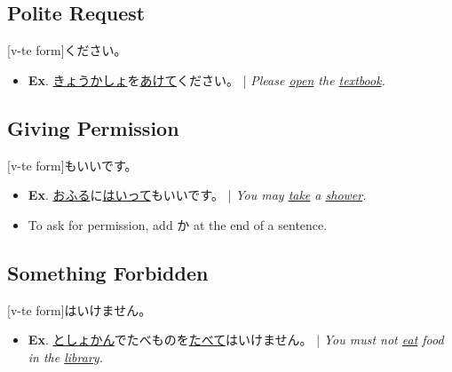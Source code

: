 \documentclass{article}
\begin{document}
\begin{CJK}{UTF8}{min}
\subsection{Polite Request}
[v-te form]ください。

\begin{itemize}
\item {\bf Ex}. \uline{きょうかしょ}を\uline{あけて}ください。 | \emph{Please \uline{open} the \uline{textbook}.}
\end{itemize}

\subsection{Giving Permission}
[v-te form]もいいです。

\begin{itemize}
\item {\bf Ex}. \uline{おふる}に\uline{はいって}もいいです。 | \emph{You may \uline{take} a \uline{shower}.}
\item To ask for permission, add か at the end of a sentence.
\end{itemize}

\subsection{Something Forbidden}
[v-te form]はいけません。

\begin{itemize}
\item {\bf Ex}. \uline{としょかん}でたべものを\uline{たべて}はいけません。 | \emph{You must not \uline{eat} food in the \uline{library}.}
\end{itemize}












\end{CJK}
\end{document}
